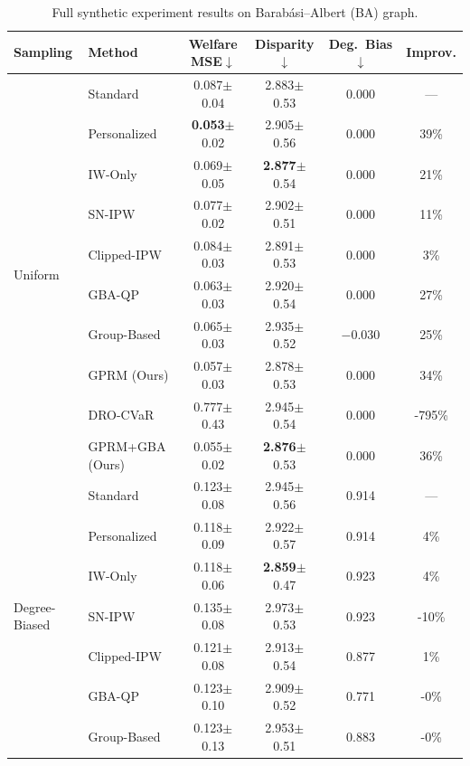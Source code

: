 \documentclass{article}
\theoremstyle{plain}
\theoremstyle{definition}
\theoremstyle{remark}
\begin{document}
\begin{table}[h]
\caption{Full synthetic experiment results on Barabási--Albert (BA) graph.}
\label{tab:ba-full-results}
\centering\small
\begin{tabular}{llcccc}
\toprule
\textbf{Sampling} & \textbf{Method} & \textbf{Welfare MSE}$\downarrow$ & \textbf{Disparity}$\downarrow$ & \textbf{Deg.\ Bias}$\downarrow$ & \textbf{Improv.} \\
\midrule
\multirow{10}{*}{Uniform}
& Standard & 0.087{\tiny$\pm$0.04} & 2.883{\tiny$\pm$0.53} & 0.000 & --- \\
& Personalized & \textbf{0.053}{\tiny$\pm$0.02} & 2.905{\tiny$\pm$0.56} & 0.000 & 39\% \\
& IW-Only & 0.069{\tiny$\pm$0.05} & \textbf{2.877}{\tiny$\pm$0.54} & 0.000 & 21\% \\
& SN-IPW & 0.077{\tiny$\pm$0.02} & 2.902{\tiny$\pm$0.51} & 0.000 & 11\% \\
& Clipped-IPW & 0.084{\tiny$\pm$0.03} & 2.891{\tiny$\pm$0.53} & 0.000 & 3\% \\
& GBA-QP & 0.063{\tiny$\pm$0.03} & 2.920{\tiny$\pm$0.54} & 0.000 & 27\% \\
& Group-Based & 0.065{\tiny$\pm$0.03} & 2.935{\tiny$\pm$0.52} & $-$0.030 & 25\% \\
& GPRM (Ours) & 0.057{\tiny$\pm$0.03} & 2.878{\tiny$\pm$0.53} & 0.000 & 34\% \\
& DRO-CVaR & 0.777{\tiny$\pm$0.43} & 2.945{\tiny$\pm$0.54} & 0.000 & -795\% \\
& GPRM+GBA (Ours) & 0.055{\tiny$\pm$0.02} & \textbf{2.876}{\tiny$\pm$0.53} & 0.000 & 36\% \\
\midrule
\multirow{10}{*}{Degree-Biased}
& Standard & 0.123{\tiny$\pm$0.08} & 2.945{\tiny$\pm$0.56} & 0.914 & --- \\
& Personalized & 0.118{\tiny$\pm$0.09} & 2.922{\tiny$\pm$0.57} & 0.914 & 4\% \\
& IW-Only & 0.118{\tiny$\pm$0.06} & \textbf{2.859}{\tiny$\pm$0.47} & 0.923 & 4\% \\
& SN-IPW & 0.135{\tiny$\pm$0.08} & 2.973{\tiny$\pm$0.53} & 0.923 & -10\% \\
& Clipped-IPW & 0.121{\tiny$\pm$0.08} & 2.913{\tiny$\pm$0.54} & 0.877 & 1\% \\
& GBA-QP & 0.123{\tiny$\pm$0.10} & 2.909{\tiny$\pm$0.52} & 0.771 & -0\% \\
& Group-Based & 0.123{\tiny$\pm$0.13} & 2.953{\tiny$\pm$0.51} & 0.883 & -0\% \\

\end{tabular}
\end{table}
\end{document}
